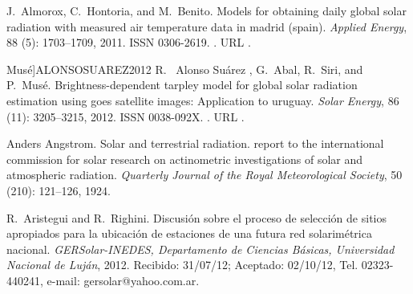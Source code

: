 \documentclass[letterpaper,12pt, twoside]{report}
\providecommand{\DIFdeltex}[1]{{\protect\color{red} \scriptsize #1}} %
\providecommand{\DIFdel}[1]{\texorpdfstring{\DIFdeltex{#1}}{}} %
\begin{document}
\DIFdel{J.~Almorox, C.~Hontoria, and M.~Benito.
}%
\DIFdel{Models for obtaining daily global solar radiation with measured air
  temperature data in madrid (spain).
}%
\DIFdel{\emph{Applied Energy}, 88}%
\DIFdel{(5):}%
\DIFdel{1703--1709, 2011.
}%
\DIFdel{ISSN 0306-2619.
}%
\DIFdel{.
}%
\DIFdel{URL
  }%
\DIFdel{.
}%

  Musé]{ALONSOSUAREZ2012}
\DIFdel{R.~}%
\DIFdel{Alonso Suárez}%
\DIFdel{, G.~Abal, R.~Siri, and P.~Musé.
}%
\DIFdel{Brightness-dependent tarpley model for global solar radiation
  estimation using goes satellite images: Application to uruguay.
}%
\DIFdel{\emph{Solar Energy}, 86}%
\DIFdel{(11):}%
\DIFdel{3205--3215, 2012.
}%
\DIFdel{ISSN 0038-092X.
}%
\DIFdel{.
}%
\DIFdel{URL
  }%
\DIFdel{.
}%

\DIFdel{Anders Angstrom.
}%
\DIFdel{Solar and terrestrial radiation. report to the international
  commission for solar research on actinometric investigations of solar and
  atmospheric radiation.
}%
\DIFdel{\emph{Quarterly Journal of the Royal Meteorological Society},
  50}%
\DIFdel{(210):}%
\DIFdel{121--126, 1924.
}%

\DIFdel{R.~Aristegui and R.~Righini.
}%
\DIFdel{Discusión sobre el proceso de selección de sitios apropiados para
  la ubicación de estaciones de una futura red solarimétrica nacional.
}%
\DIFdel{\emph{GERSolar-INEDES, Departamento de Ciencias Básicas, Universidad
  Nacional de Luján}, 2012.
}%
\DIFdel{Recibido: 31/07/12; Aceptado: 02/10/12, Tel. 02323-440241, e-mail:
  gersolar@yahoo.com.ar.
}%
\end{document}
